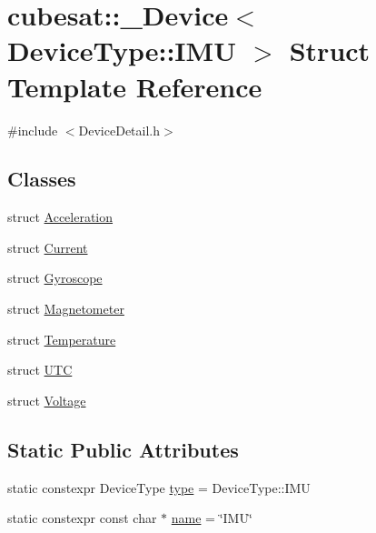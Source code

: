 \hypertarget{structcubesat_1_1__Device_3_01DeviceType_1_1IMU_01_4}{}\section{cubesat\+:\+:\+\_\+\+Device$<$ Device\+Type\+:\+:I\+MU $>$ Struct Template Reference}
\label{structcubesat_1_1__Device_3_01DeviceType_1_1IMU_01_4}


{\ttfamily \#include $<$Device\+Detail.\+h$>$}

\subsection*{Classes}
\begin{DoxyCompactItemize}
\item 
struct \hyperlink{structcubesat_1_1__Device_3_01DeviceType_1_1IMU_01_4_1_1Acceleration}{Acceleration}
\item 
struct \hyperlink{structcubesat_1_1__Device_3_01DeviceType_1_1IMU_01_4_1_1Current}{Current}
\item 
struct \hyperlink{structcubesat_1_1__Device_3_01DeviceType_1_1IMU_01_4_1_1Gyroscope}{Gyroscope}
\item 
struct \hyperlink{structcubesat_1_1__Device_3_01DeviceType_1_1IMU_01_4_1_1Magnetometer}{Magnetometer}
\item 
struct \hyperlink{structcubesat_1_1__Device_3_01DeviceType_1_1IMU_01_4_1_1Temperature}{Temperature}
\item 
struct \hyperlink{structcubesat_1_1__Device_3_01DeviceType_1_1IMU_01_4_1_1UTC}{U\+TC}
\item 
struct \hyperlink{structcubesat_1_1__Device_3_01DeviceType_1_1IMU_01_4_1_1Voltage}{Voltage}
\end{DoxyCompactItemize}
\subsection*{Static Public Attributes}
\begin{DoxyCompactItemize}
\item 
static constexpr Device\+Type \hyperlink{structcubesat_1_1__Device_3_01DeviceType_1_1IMU_01_4_a9b40a9ab113eafbff0b4e53782b72603}{type} = Device\+Type\+::\+I\+MU
\item 
static constexpr const char $\ast$ \hyperlink{structcubesat_1_1__Device_3_01DeviceType_1_1IMU_01_4_ac1d1439bf7274a528c8944e344ae9d71}{name} = \char`\"{}I\+MU\char`\"{}
\end{DoxyCompactItemize}


